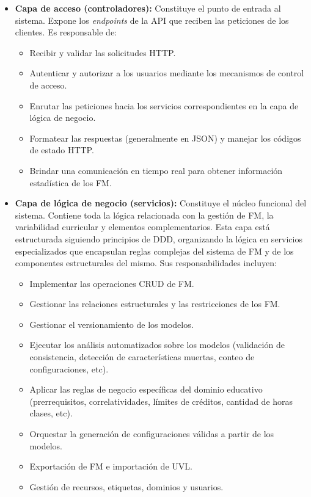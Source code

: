 \begin{itemize}
    \item \textbf{Capa de acceso (controladores):} Constituye el punto de entrada al sistema. 
	Expone los \textit{endpoints} de la \ac{API} que reciben las peticiones de los clientes. Es responsable de:
    \begin{itemize}
        \item Recibir y validar las solicitudes \ac{HTTP}.
        \item Autenticar y autorizar a los usuarios mediante los mecanismos de control de acceso.
        \item Enrutar las peticiones hacia los servicios correspondientes en la capa de lógica de negocio.
        \item Formatear las respuestas (generalmente en \ac{JSON}) y manejar los códigos de estado \ac{HTTP}.
        \item Brindar una comunicación en tiempo real para obtener información estadística de los \ac{FM}.
    \end{itemize}
    
    \item \textbf{Capa de lógica de negocio (servicios):} Constituye el núcleo funcional del sistema. 
	Contiene toda la lógica relacionada con la gestión de \ac{FM}, la variabilidad curricular y 
	elementos complementarios. Esta capa está estructurada siguiendo principios de \ac{DDD}, organizando la lógica en servicios especializados que encapsulan reglas 
	complejas del sistema de \ac{FM} y de los componentes estructurales del mismo.
	Sus responsabilidades incluyen:
    \begin{itemize}
        \item Implementar las operaciones \ac{CRUD} de \ac{FM}.
        \item Gestionar las relaciones estructurales y las restricciones de los \ac{FM}.
        \item Gestionar el versionamiento de los modelos.
        \item Ejecutar los análisis automatizados sobre los modelos (validación de consistencia, detección de características muertas, conteo de configuraciones, etc).
        \item Aplicar las reglas de negocio específicas del dominio educativo (prerrequisitos, correlatividades, límites de créditos, cantidad de horas clases, etc).
        \item Orquestar la generación de configuraciones válidas a partir de los modelos.
        \item Exportación de \ac{FM} e importación de \ac{UVL}.
        \item Gestión de recursos, etiquetas, dominios y usuarios.
    \end{itemize}
    

\end{itemize}

